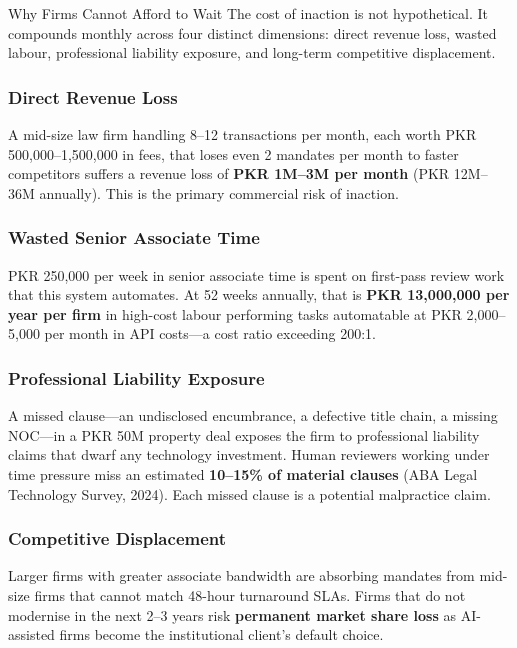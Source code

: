 \documentclass[12pt, a4paper]{article}
\begin{document}
\begin{warningbox}{Why Firms Cannot Afford to Wait}
The cost of inaction is not hypothetical. It compounds monthly across four
distinct dimensions: direct revenue loss, wasted labour, professional liability
exposure, and long-term competitive displacement.
\end{warningbox}

\subsubsection{Direct Revenue Loss}

A mid-size law firm handling 8--12 transactions per month, each worth PKR
500,000--1,500,000 in fees, that loses even 2 mandates per month to faster
competitors suffers a revenue loss of \textbf{PKR 1M--3M per month}
(PKR 12M--36M annually). This is the primary commercial risk of inaction.

\subsubsection{Wasted Senior Associate Time}

PKR 250,000 per week in senior associate time is spent on first-pass review
work that this system automates. At 52 weeks annually, that is
\textbf{PKR 13,000,000 per year per firm} in high-cost labour performing tasks
automatable at PKR 2,000--5,000 per month in API costs---a cost ratio
exceeding 200:1.

\subsubsection{Professional Liability Exposure}

A missed clause---an undisclosed encumbrance, a defective title chain, a missing
NOC---in a PKR 50M property deal exposes the firm to professional liability claims
that dwarf any technology investment. Human reviewers working under time pressure
miss an estimated \textbf{10--15\% of material clauses} (ABA Legal Technology
Survey, 2024). Each missed clause is a potential malpractice claim.

\subsubsection{Competitive Displacement}

Larger firms with greater associate bandwidth are absorbing mandates from mid-size
firms that cannot match 48-hour turnaround SLAs. Firms that do not modernise in
the next 2--3 years risk \textbf{permanent market share loss} as AI-assisted firms
become the institutional client's default choice.
\end{document}
